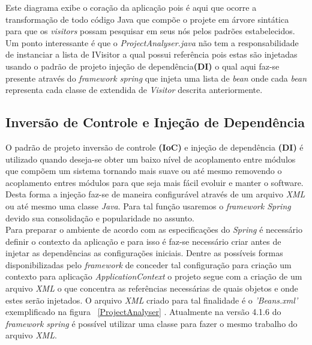 Este diagrama exibe o coração da aplicação pois é aqui que ocorre a transformação de todo código Java que compõe o projete em árvore sintática para que os {\it visitors}  \cite{Gamma:1995:DPE:186897} possam pesquisar em seus nós pelos padrões estabelecidos.\\

Um ponto interessante é que o \textit{ProjectAnalyser.java} não tem a responsabilidade de instanciar a lista de IVisitor a qual possui referência pois estas são injetadas usando o padrão de projeto injeção de dependência\textbf{(DI)} o qual aqui faz-se presente através do {\it framework spring} que injeta uma lista de \textit{bean} onde cada \textit{bean} representa cada classe de extendida de {\it Visitor} descrita anteriormente.\\

\clearpage


\subsection{Inversão de Controle e Injeção de Dependência}
O padrão de projeto inversão de controle \textbf{(IoC)} e injeção de dependência \textbf{(DI)} é utilizado quando deseja-se obter um baixo nível de acoplamento entre módulos que compõem um sistema tornando mais suave ou até mesmo removendo o acoplamento entres módulos para que seja mais fácil evoluir e manter o software. Desta forma a injeção faz-se de maneira configurável através de um arquivo \textit{XML} ou até mesmo uma classe \textit{Java}. Para tal função usaremos o {\it framework Spring} devido sua consolidação e popularidade no assunto.\\

Para preparar o ambiente de acordo com as especificações do {\it Spring} é necessário definir o contexto da aplicação e para isso é faz-se necessário criar antes de injetar as dependências as configurações iniciais. Dentre as possíveis formas disponibilizadas pelo {\it framework} de conceder tal configuração para criação um contexto para aplicação \textit{ApplicationContext} o projeto segue com a criação de um arquivo \textit{XML} o que concentra as referências necessárias de quais objetos e onde estes serão injetados. O arquivo \textit{XML} criado para tal finalidade é o \textit{'Beans.xml'} exemplificado na figura ~\ref{ProjectAnalyser} . Atualmente na versão 4.1.6 do {\it framework spring} é possível utilizar uma classe para fazer o mesmo trabalho do arquivo \textit{XML}. \\


